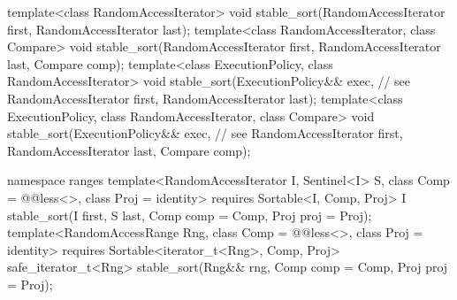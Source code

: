 \begin{codeblock}
  template<class RandomAccessIterator>
    void stable_sort(RandomAccessIterator first, RandomAccessIterator last);
  template<class RandomAccessIterator, class Compare>
    void stable_sort(RandomAccessIterator first, RandomAccessIterator last,
                     Compare comp);
  template<class ExecutionPolicy, class RandomAccessIterator>
    void stable_sort(ExecutionPolicy&& exec, // see 
                     RandomAccessIterator first, RandomAccessIterator last);
  template<class ExecutionPolicy, class RandomAccessIterator, class Compare>
    void stable_sort(ExecutionPolicy&& exec, // see 
                     RandomAccessIterator first, RandomAccessIterator last,
                     Compare comp);
\end{codeblock}\begin{addedblock}\begin{codeblock}
  namespace ranges {
    template<RandomAccessIterator I, Sentinel<I> S, class Comp = @@less<>,
        class Proj = identity>
      requires Sortable<I, Comp, Proj>
      I stable_sort(I first, S last, Comp comp = Comp{}, Proj proj = Proj{});
    template<RandomAccessRange Rng, class Comp = @@less<>, class Proj = identity>
      requires Sortable<iterator_t<Rng>, Comp, Proj>
      safe_iterator_t<Rng>
        stable_sort(Rng&& rng, Comp comp = Comp{}, Proj proj = Proj{});
  }
\end{codeblock}\end{addedblock}\begin{codeblock}


\end{codeblock}
